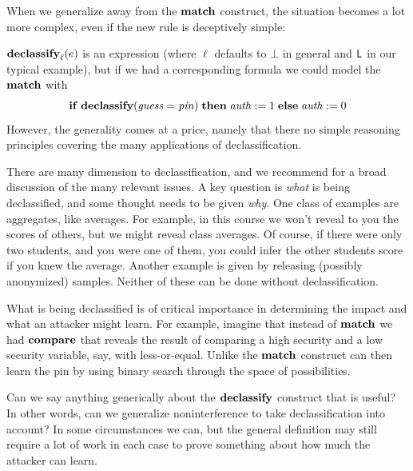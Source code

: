 \documentclass[11pt]{article}
\begin{document}
When we generalize away from the $\mathbf{match}$ construct, the situation becomes a
lot more complex, even if the new rule is deceptively simple:
\begin{rules}
  {\mathstrut}
\end{rules}
$\mathbf{declassify}_\ell(e)$ is an expression (where $\ell$ defaults to $\bot$ in
general and $\mathsf{L}$ in our typical example), but if we had a corresponding
formula we could model the $\mathbf{match}$ with
\[
  \mathbf{if}\; \mathbf{declassify}(\mathit{guess} = \mathit{pin})\; \mathbf{then}\; \mathit{auth} := 1\; \mathbf{else}\;
  \mathit{auth} := 0
\]
However, the generality comes at a price, namely that there no simple reasoning
principles covering the many applications of declassification.

There are many dimension to declassification, and we recommend
\citet{Sabelfeld09jcs} for a broad discussion of the many relevant issues.  A
key question is \emph{what} is being declassified, and some thought needs to be
given \emph{why}.  One class of examples are aggregates, like averages.  For
example, in this course we won't reveal to you the scores of others, but we
might reveal class averages.  Of course, if there were only two students, and
you were one of them, you could infer the other students score if you knew the
average.  Another example is given by releasing (possibly anonymized) samples.
Neither of these can be done without declassification.

What is being declassified is of critical importance in determining the impact
and what an attacker might learn.  For example, imagine that instead of
$\mathbf{match}$ we had $\mathbf{compare}$ that reveals the result of comparing a high
security and a low security variable, say, with less-or-equal.  Unlike the
$\mathbf{match}$ construct can then learn the pin by using binary search through the
space of possibilities.

Can we say anything generically about the $\mathbf{declassify}$ construct that is
useful?  In other words, can we generalize noninterference to take
declassification into account?  In some circumstances we can, but the general
definition may still require a lot of work in each case to prove something
about how much the attacker can learn.
\end{document}
